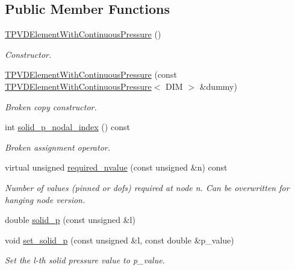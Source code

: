 \subsection*{Public Member Functions}
\begin{DoxyCompactItemize}
\item 
\hyperlink{classoomph_1_1TPVDElementWithContinuousPressure_a33256a965bca2ec231d8f92aa37b7e25}{T\+P\+V\+D\+Element\+With\+Continuous\+Pressure} ()
\begin{DoxyCompactList}\small\item\em Constructor. \end{DoxyCompactList}\item 
\hyperlink{classoomph_1_1TPVDElementWithContinuousPressure_ab17219ca199556bee57f0b467147d263}{T\+P\+V\+D\+Element\+With\+Continuous\+Pressure} (const \hyperlink{classoomph_1_1TPVDElementWithContinuousPressure}{T\+P\+V\+D\+Element\+With\+Continuous\+Pressure}$<$ D\+IM $>$ \&dummy)
\begin{DoxyCompactList}\small\item\em Broken copy constructor. \end{DoxyCompactList}\item 
int \hyperlink{classoomph_1_1TPVDElementWithContinuousPressure_aa39375a80e84e370d1633122e87ad86d}{solid\+\_\+p\+\_\+nodal\+\_\+index} () const
\begin{DoxyCompactList}\small\item\em Broken assignment operator. \end{DoxyCompactList}\item 
virtual unsigned \hyperlink{classoomph_1_1TPVDElementWithContinuousPressure_a52d0846a380729a94241bf89bd776053}{required\+\_\+nvalue} (const unsigned \&n) const
\begin{DoxyCompactList}\small\item\em Number of values (pinned or dofs) required at node n. Can be overwritten for hanging node version. \end{DoxyCompactList}\item 
double \hyperlink{classoomph_1_1TPVDElementWithContinuousPressure_aa0a9aad423ffe12eb10f07af6850191c}{solid\+\_\+p} (const unsigned \&l)
\item 
void \hyperlink{classoomph_1_1TPVDElementWithContinuousPressure_a3dd6618975cc1eb47cb4a4da4c3f9274}{set\+\_\+solid\+\_\+p} (const unsigned \&l, const double \&p\+\_\+value)
\begin{DoxyCompactList}\small\item\em Set the l-\/th solid pressure value to p\+\_\+value. \end{DoxyCompactList}\item 

\end{DoxyCompactItemize}
